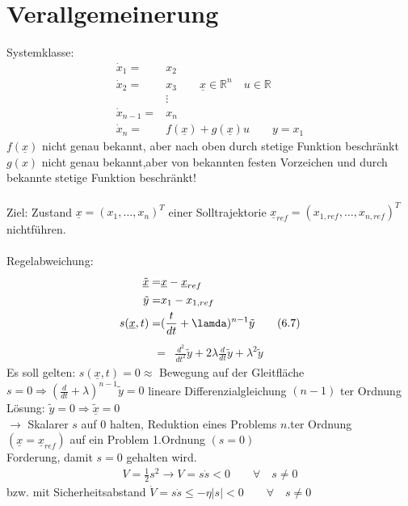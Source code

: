 \documentclass[ngerman]{tudscrreprt}
\begin{document}
\section{ Verallgemeinerung}
Systemklasse: 
\begin{align*}
\dot x_1 = &x_2 \\
\dot x_2 =& x_3 \qquad \underline x\in \mathbb{R}^n \quad u\in \mathbb{R}\\
&\vdots\\
\dot x_{n-1} =&x_n\\
\dot x_n =& f(\underline x) + g(\underline x)u \qquad y=x_1 \tag{6.6}
\end{align*}
$f(\underline x)$ nicht genau bekannt, aber nach oben durch stetige Funktion beschränkt $g(x)$ nicht genau bekannt,aber von bekannten festen Vorzeichen und durch bekannte stetige Funktion beschränkt!\\
\\
Ziel: Zustand $\underline x= (x_1,\dots, x_n)^T $ einer Solltrajektorie $\underline x_{ref} = (x_{1,ref},\dots, x_{n,ref})^T$ nichtführen. \\
\\
Regelabweichung: 
\begin{align*}
\underline{\tilde{x}} =& \underline x - \underline x_{ref}\\
\tilde y =& x_1 - x_{1,ref}\\
s(\underline x,t) =& (\frac{t}{dt} + \lamda)^{n-1}\tilde y \tag{6.7}\\
\end{align*}
\begin{align*}
=& \frac{d^2}{dt^2}\tilde y + 2\lambda \frac{d}{dt}\tilde y +\lambda^2 \tilde y
\end{align*}
Es soll gelten: $s(\underline x,t) = 0 \approx$ Bewegung auf der Gleitfläche\\
$s=0 \Rightarrow (\frac{d}{dt} + \lambda)^{n-1} \tilde y = 0$ lineare Differenzialgleichung $ (n-1)$ ter Ordnung \\
Lösung: $\tilde y= 0 \Rightarrow \tilde{\underline x} =0$  \\ 
$\rightarrow$ Skalarer $s$ auf $0$ halten, Reduktion eines Problems $n.$ter Ordnung $(\underline x=\underline x_{ref})$ auf ein Problem 1.Ordnung $(s=0)$\\
Forderung, damit $s=0$ gehalten wird.
\begin{align*}
V=\frac{1}{2}s^2 \rightarrow V=s\dot s <0 \qquad \forall \quad s\ne 0
\end{align*}
bzw. mit Sicherheitsabstand $\dot V = s\dot s \le -\eta|s| < 0\qquad \forall \quad s\ne 0$ 
\end{document}
